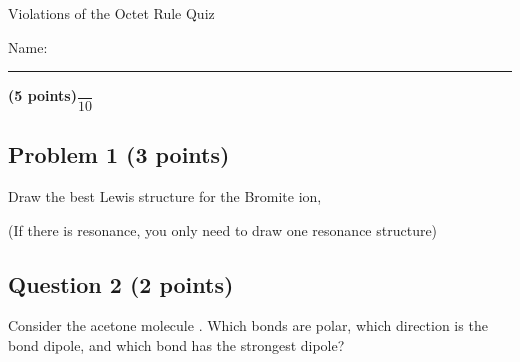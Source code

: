 \documentclass[12pt, letterpaper]{memoir}
\begin{document}
	\begin{center}
		{\large Violations of the Octet Rule Quiz}
	\end{center}
	{\large Name: \rule[-1mm]{4in}{.1pt} {\bfseries (5 points)}\hspace{4em}$\dfrac{~}{10}$} 
	
	\subsection*{Problem 1 (3 points)}
	Draw the best Lewis structure for the Bromite ion, 
	
	\noindent(If there is resonance, you only need to draw one resonance structure)
	
	\vspace{18em}
	\subsection*{Question 2 (2 points)}
	Consider the acetone molecule . Which bonds are polar, which direction is the bond dipole, and which bond has the strongest dipole?
	
	
\end{document}

